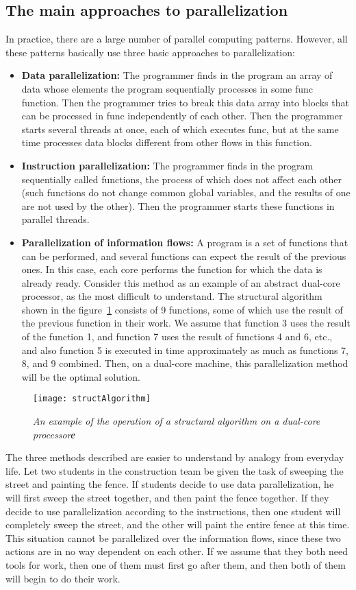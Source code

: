 { %
	\subsection{The main approaches to parallelization}
	\par In practice, there are a large number of parallel computing patterns. However, all these patterns basically use three basic approaches to parallelization:
	\begin{itemize}
		\item\textbf{Data parallelization:} The programmer finds in the program an array of data whose elements the program sequentially processes in some func function. Then the programmer tries to break this data array into blocks that can be processed in func independently of each other. Then the programmer starts several threads at once, each of which executes func, but at the same time processes data blocks different from other flows in this function.
		\item\textbf{Instruction parallelization:} The programmer finds in the program sequentially called functions, the process of which does not affect each other (such functions do not change common global variables, and the results of one are not used by the other). Then the programmer starts these functions in parallel threads.
		\item\textbf{Parallelization of information flows:} A program is a set of functions that can be performed, and several functions can expect the result of the previous ones. In this case, each core performs the function for which the data is already ready. Consider this method as an example of an abstract dual-core processor, as the most difficult to understand. The structural algorithm shown in the figure~\ref{structAlgorithm:image} consists of 9 functions, some of which use the result of the previous function in their work. We assume that function 3 uses the result of the function 1, and function 7 uses the result of functions 4 and 6, etc., and also function 5 is executed in time approximately as much as functions 7, 8, and 9 combined. Then, on a dual-core machine, this parallelization method will be the optimal solution.
	\end{itemize}
	\begin{figure}[H]
		\texttt{[image: structAlgorithm]}
		\caption{\textit{An example of the operation of a structural algorithm on a dual-core processorе}}
		\label{structAlgorithm:image}
	\end{figure}
	\par The three methods described are easier to understand by analogy from everyday life. Let two students in the construction team be given the task of sweeping the street and painting the fence. If students decide to use data parallelization, he will first sweep the street together, and then paint the fence together. If they decide to use parallelization according to the instructions, then one student will completely sweep the street, and the other will paint the entire fence at this time. This situation cannot be parallelized over the information flows, since these two actions are in no way dependent on each other. If we assume that they both need tools for work, then one of them must first go after them, and then both of them will begin to do their work.
}
